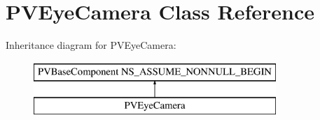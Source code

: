\hypertarget{interface_p_v_eye_camera}{}\section{P\+V\+Eye\+Camera Class Reference}
\label{interface_p_v_eye_camera}
Inheritance diagram for P\+V\+Eye\+Camera\+:\begin{figure}[H]
\begin{center}
\leavevmode
\includegraphics[height=2.000000cm]{interface_p_v_eye_camera}
\end{center}
\end{figure}

